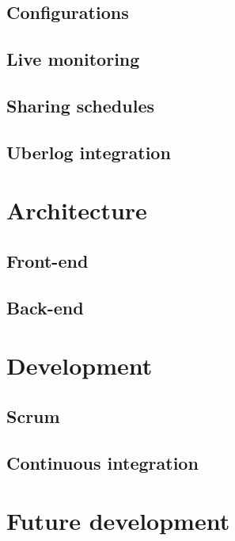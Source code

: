 \subsection{Configurations}
\subsection{Live monitoring}
\subsection{Sharing schedules}
\subsection{Uberlog integration}
\section{Architecture}
\subsection{Front-end}
\subsection{Back-end}
\section{Development}
\subsection{Scrum}
\subsection{Continuous integration}
\section{Future development}